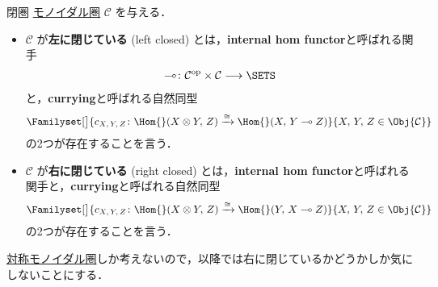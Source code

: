 \documentclass[TQFT_main]{subfiles}
\begin{document}
\begin{mydef}[label=def:closed-monoidal,breakable]{閉圏}
    \hyperref[def:monoidal-category]{モノイダル圏} $\mathcal{C}$ を与える．
    \begin{itemize}
        \item $\mathcal{C}$ が\textbf{左に閉じている} (left closed) とは，\textbf{internal hom functor}と呼ばれる関手
        \begin{align}
            \multimap \colon \mathcal{C}^{\mathrm{op}} \times \mathcal{C} \lto \SETS
        \end{align}
        と，\textbf{currying}と呼ばれる自然同型
        \begin{align}
            \Familyset[\big]{c_{X,\, Y,\, Z} \colon \Hom{}(X \otimes Y,\, Z) \xrightarrow{\cong} \Hom{}(X,\, Y \multimap Z)}{X,\, Y,\, Z \in \Obj{\mathcal{C}}}
        \end{align}
        の2つが存在することを言う．
        \item $\mathcal{C}$ が\textbf{右に閉じている} (right closed) とは，\textbf{internal hom functor}と呼ばれる関手と，\textbf{currying}と呼ばれる自然同型
        \begin{align}
            \Familyset[\big]{c_{X,\, Y,\, Z} \colon \Hom{}(X \otimes Y,\, Z) \xrightarrow{\cong} \Hom{}(Y,\, X \multimap Z)}{X,\, Y,\, Z \in \Obj{\mathcal{C}}}
        \end{align}
        の2つが存在することを言う．
    \end{itemize}
\end{mydef}

\hyperref[def:braided-monoidal]{対称モノイダル圏}しか考えないので，以降では右に閉じているかどうかしか気にしないことにする．
\end{document}

